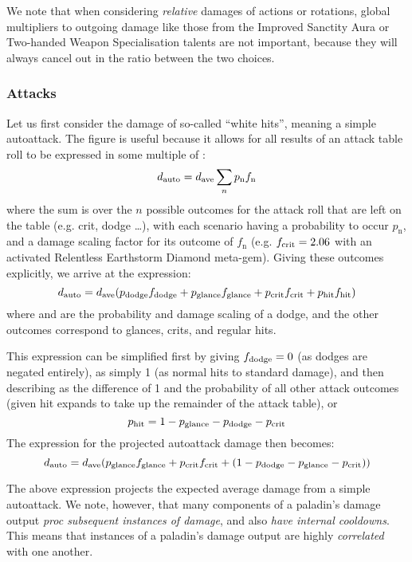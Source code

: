 We note that when considering \emph{relative} damages of actions or rotations, global multipliers to outgoing damage like those from the Improved Sanctity Aura or Two-handed Weapon Specialisation talents are not important, because they will always cancel out in the ratio between the two choices.

\subsubsection{Attacks}
Let us first consider the damage \dauto of so-called ``white hits'', meaning a simple autoattack.
The \dave figure is useful because it allows for all results of an attack table roll to be expressed in some multiple of \dave:
\begin{equation}
	d_{\mathrm{auto}}  = d_{\mathrm{ave}}  \sum_n p_{\mathrm{n}} f_{\mathrm{n}}
\end{equation}
where the sum is over the $n$ possible outcomes for the attack roll that are left on the table (e.g. crit, dodge \ldots), with each scenario having a probability to occur $p_{\mathrm{n}}$, and a damage scaling factor for its outcome of $f_{\mathrm{n}}$ (e.g. $f_{\mathrm{crit}}  = 2.06$ with an activated Relentless Earthstorm Diamond meta-gem).
Giving these outcomes explicitly, we arrive at the expression:
\begin{equation}
	d_{\mathrm{auto}}  = d_{\mathrm{ave}}  (p_{\mathrm{dodge}}  f_{\mathrm{dodge}}  + p_{\mathrm{glance}}  f_{\mathrm{glance}}  + p_{\mathrm{crit}}  f_{\mathrm{crit}}  + p_{\mathrm{hit}}  f_{\mathrm{hit}} )
\end{equation}
where \pdodge and \fdodge are the probability and damage scaling of a dodge, and the other outcomes correspond to glances, crits, and regular hits. 

This expression can be simplified first by giving $f_{\mathrm{dodge}}  = 0$ (as dodges are negated entirely), \fhit as simply 1 (as normal hits to standard damage), and then describing \phit as the difference of 1 and the probability of all other attack outcomes (given hit expands to take up the remainder of the attack table), or
\begin{equation}
	p_{\mathrm{hit}}  = 1 - p_{\mathrm{glance}}  - p_{\mathrm{dodge}}  - p_{\mathrm{crit}} 
\end{equation}
The expression for the projected autoattack damage then becomes:
\begin{equation}
	d_{\mathrm{auto}}  = d_{\mathrm{ave}}  (p_{\mathrm{glance}}  f_{\mathrm{glance}}  + p_{\mathrm{crit}}  f_{\mathrm{crit}}  + (1 - p_{\mathrm{dodge}}  - p_{\mathrm{glance}}  - p_{\mathrm{crit}} ))
\end{equation}

The above expression projects the expected average damage from a simple autoattack.
We note, however, that many components of a paladin's damage output \emph{proc subsequent instances of damage}, and also \emph{have internal cooldowns}.
This means that instances of a paladin's damage output are highly \emph{correlated} with one another.

